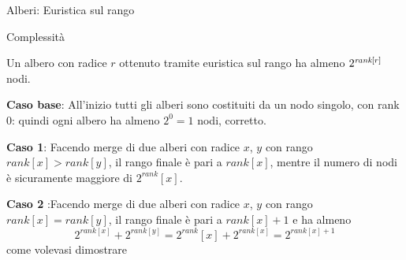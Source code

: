 \begin{frame}{Alberi: Euristica sul rango}

\vspace{-15pt}

\end{frame}

\begin{frame}{Complessità}

\vspace{-9pt}
\begin{myboxtitle}[Teorema]
Un albero \mfset con radice $r$ ottenuto tramite euristica sul rango ha almeno
$2^{\textit{rank}[r]}$ nodi.
\end{myboxtitle}

\begin{myboxtitle}
\begin{overprint}
\BIL
\item \textbf{Caso base}: All'inizio tutti gli alberi sono costituiti da un nodo singolo, con rank 0: quindi ogni albero ha almeno $2^0=1$ nodi, corretto.
\EIL
{}
\BIL
\item \textbf{Caso 1}:
Facendo merge di due alberi con radice $x$, $y$ con rango 
$\mathit{rank}[x] > \mathit{rank}[y]$, il rango finale è pari a $\mathit{rank}[x]$, mentre il numero di nodi è sicuramente maggiore
di $2^\mathit{rank}[x]$.
\EIL
{}
\BIL
\item \textbf{Caso 2} :Facendo merge di due alberi con radice $x$, $y$ con rango $\mathit{rank}[x] = \mathit{rank}[y]$, il rango finale è pari a $\mathit{rank}[x]+1$ e ha almeno 
\[
  2^{\mathit{rank}[x]}+2^{\mathit{rank}[y]} = 2^\mathit{rank}[x] + 2^{\mathit{rank}[x]} = 2^{\mathit{rank}[x]+1}
\]
come volevasi dimostrare
\EIL
\end{overprint}
\end{myboxtitle}



\end{frame}

